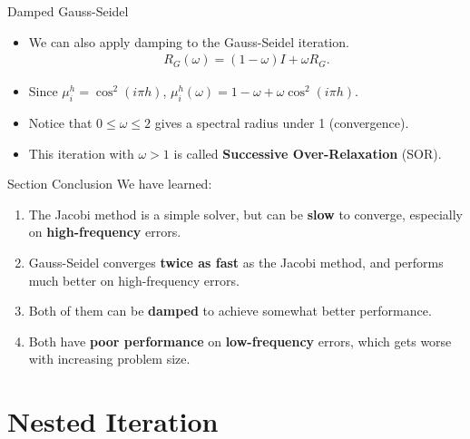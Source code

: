 \documentclass{beamer}
\begin{document}
\begin{frame}{Damped Gauss-Seidel}
 \begin{itemize}
  \item We can also apply damping to the Gauss-Seidel iteration.
  \begin{align}
   R_G(\omega) = (1-\omega)I + \omega R_G.
  \end{align}
  \item Since $\mu_i^h = \cos^2(i\pi h)$, $\mu_i^h(\omega) = 1 - \omega + \omega \cos^2(i\pi h)$.
  \item Notice that $0 \leq \omega \leq 2$ gives a spectral radius under 1 (convergence).
  \item This iteration with $\omega > 1$ is called
        \textbf{Successive Over-Relaxation} (SOR).
 \end{itemize}
\end{frame}

\begin{frame}{Section Conclusion}
 We have learned:
 \begin{enumerate}
  \item The Jacobi method is a simple solver, but can be \textbf{slow} to converge,
        especially on \textbf{high-frequency} errors.
  \item Gauss-Seidel converges \textbf{twice as fast} as the Jacobi method, and
        performs much better on high-frequency errors.
  \item Both of them can be \textbf{damped} to achieve somewhat better performance.
  \item Both have \textbf{poor performance} on \textbf{low-frequency} errors, which gets
        worse with increasing problem size.
 \end{enumerate}
\end{frame}

\section{Nested Iteration}%
\end{document}
